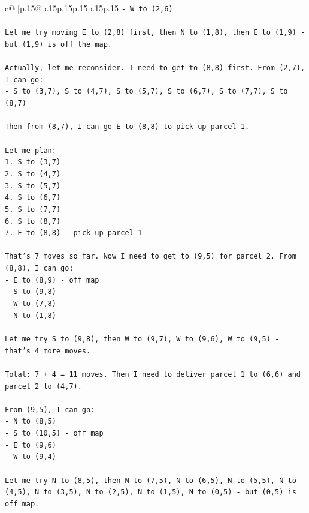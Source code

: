 \documentclass{article}
\begin{document}
{\begin{supertabular}{c@{$\;$}|p{.15\linewidth}@{}p{.15\linewidth}p{.15\linewidth}p{.15\linewidth}p{.15\linewidth}p{.15\linewidth}}
{{{\texttt{{-} W to (2,6)} \\
\\ 
\texttt{Let me try moving E to (2,8) first, then N to (1,8), then E to (1,9) {-} but (1,9) is off the map.} \\
\\ 
\texttt{Actually, let me reconsider. I need to get to (8,8) first. From (2,7), I can go:} \\
\texttt{{-} S to (3,7), S to (4,7), S to (5,7), S to (6,7), S to (7,7), S to (8,7)} \\
\\ 
\texttt{Then from (8,7), I can go E to (8,8) to pick up parcel 1.} \\
\\ 
\texttt{Let me plan:} \\
\texttt{1. S to (3,7)} \\
\texttt{2. S to (4,7)} \\
\texttt{3. S to (5,7)} \\
\texttt{4. S to (6,7)} \\
\texttt{5. S to (7,7)} \\
\texttt{6. S to (8,7)} \\
\texttt{7. E to (8,8) {-} pick up parcel 1} \\
\\ 
\texttt{That's 7 moves so far. Now I need to get to (9,5) for parcel 2. From (8,8), I can go:} \\
\texttt{{-} E to (8,9) {-} off map} \\
\texttt{{-} S to (9,8)} \\
\texttt{{-} W to (7,8)} \\
\texttt{{-} N to (1,8)} \\
\\ 
\texttt{Let me try S to (9,8), then W to (9,7), W to (9,6), W to (9,5) {-} that's 4 more moves.} \\
\\ 
\texttt{Total: 7 + 4 = 11 moves. Then I need to deliver parcel 1 to (6,6) and parcel 2 to (4,7).} \\
\\ 
\texttt{From (9,5), I can go:} \\
\texttt{{-} N to (8,5)} \\
\texttt{{-} S to (10,5) {-} off map} \\
\texttt{{-} E to (9,6)} \\
\texttt{{-} W to (9,4)} \\
\\ 
\texttt{Let me try N to (8,5), then N to (7,5), N to (6,5), N to (5,5), N to (4,5), N to (3,5), N to (2,5), N to (1,5), N to (0,5) {-} but (0,5) is off map.} \\
}}}
\end{supertabular}}
\end{document}
